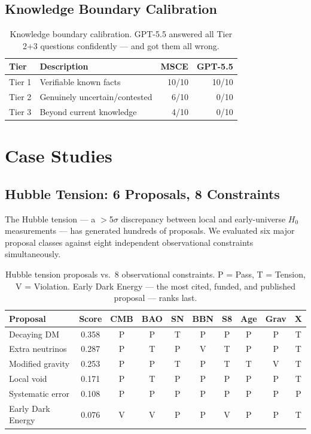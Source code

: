 \documentclass[11pt,a4paper]{article}
\begin{document}
\subsection{Knowledge Boundary Calibration}

\begin{table}[ht]
\centering
\begin{tabular}{llrr}
\toprule
\textbf{Tier} & \textbf{Description} & \textbf{MSCE} & \textbf{GPT-5.5} \\
\midrule
Tier 1 & Verifiable known facts & 10/10 & 10/10 \\
Tier 2 & Genuinely uncertain/contested & 6/10 & 0/10 \\
Tier 3 & Beyond current knowledge & 4/10 & 0/10 \\
\bottomrule
\end{tabular}
\caption{Knowledge boundary calibration. GPT-5.5 answered all Tier 2+3 questions confidently — and got them all wrong.}
\end{table}

\section{Case Studies}

\subsection{Hubble Tension: 6 Proposals, 8 Constraints}

The Hubble tension — a $>$5$\sigma$ discrepancy between local and early-universe $H_0$ measurements \cite{planck2018, riess2022} — has generated hundreds of proposals. We evaluated six major proposal classes against eight independent observational constraints simultaneously.

\begin{table}[ht]
\centering
\begin{tabular}{lccccccccc}
\toprule
\textbf{Proposal} & \textbf{Score} & \textbf{CMB} & \textbf{BAO} & \textbf{SN} & \textbf{BBN} & \textbf{S8} & \textbf{Age} & \textbf{Grav} & \textbf{X} \\
\midrule
Decaying DM & 0.358 & P & P & T & P & P & P & P & T \\
Extra neutrinos & 0.287 & P & T & P & V & T & P & P & T \\
Modified gravity & 0.253 & P & P & T & P & T & T & V & T \\
Local void & 0.171 & P & T & P & P & P & P & P & T \\
Systematic error & 0.108 & P & P & P & P & P & P & P & P \\
Early Dark Energy & 0.076 & V & V & P & P & V & P & P & T \\
\bottomrule
\end{tabular}
\caption{Hubble tension proposals vs.\ 8 observational constraints. P = Pass, T = Tension, V = Violation. Early Dark Energy — the most cited, funded, and published proposal — ranks last.}
\end{table}
\end{document}
